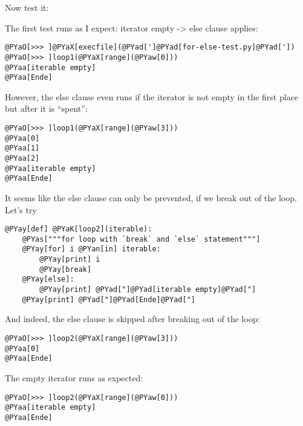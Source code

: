 \documentclass[10pt,a4paper,english]{scrartcl}
\begin{document}
Now test it:

The first test runs as I expect: iterator empty -{\textgreater} else clause applies:
\begin{Verbatim}[commandchars=@\[\]]
@PYaO[>>> ]@PYaX[execfile](@PYad[']@PYad[for-else-test.py]@PYad['])
@PYaO[>>> ]loop1(@PYaX[range](@PYaw[0]))
@PYaa[iterable empty]
@PYaa[Ende]
\end{Verbatim}

However, the else clause even runs if the iterator is not empty in the first
place but after it is ``spent'':
\begin{Verbatim}[commandchars=@\[\]]
@PYaO[>>> ]loop1(@PYaX[range](@PYaw[3]))
@PYaa[0]
@PYaa[1]
@PYaa[2]
@PYaa[iterable empty]
@PYaa[Ende]
\end{Verbatim}

It seems like the else clause can only be prevented, if we break out of
the loop. Let's try
\begin{Verbatim}[commandchars=@\[\]]
@PYay[def] @PYaK[loop2](iterable):
    @PYas["""for loop with `break` and `else` statement"""]
    @PYay[for] i @PYan[in] iterable:
        @PYay[print] i
        @PYay[break]
    @PYay[else]:
        @PYay[print] @PYad["]@PYad[iterable empty]@PYad["]
    @PYay[print] @PYad["]@PYad[Ende]@PYad["]
\end{Verbatim}

And indeed, the else clause is skipped after breaking out of the loop:
\begin{Verbatim}[commandchars=@\[\]]
@PYaO[>>> ]loop2(@PYaX[range](@PYaw[3]))
@PYaa[0]
@PYaa[Ende]
\end{Verbatim}

The empty iterator runs as expected:
\begin{Verbatim}[commandchars=@\[\]]
@PYaO[>>> ]loop2(@PYaX[range](@PYaw[0]))
@PYaa[iterable empty]
@PYaa[Ende]
\end{Verbatim}
\end{document}
